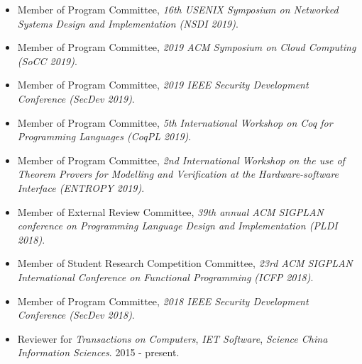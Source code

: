 \documentclass[10pt]{article}
\newenvironment{innerlist}[1][\enskip\textbullet]%
        {\begin{itemize}[#1,leftmargin=25pt,parsep=0pt,itemsep=2pt,topsep=2pt,partopsep=0pt]}
        {\end{itemize}}
\begin{document}
\begin{innerlist}

\item[] Member of Program Committee,
\emph{16th USENIX Symposium on Networked Systems Design and Implementation ({NSDI 2019})}.
\vspace{0.05in}

\item[] Member of Program Committee,
\emph{2019 ACM Symposium on Cloud Computing ({SoCC 2019})}.
\vspace{0.05in}

\item[] Member of Program Committee,
\emph{2019 IEEE Security Development Conference ({SecDev 2019})}.
\vspace{0.05in}

\item[] Member of Program Committee,
\emph{5th International Workshop on Coq for Programming Languages ({CoqPL 2019})}.
\vspace{0.05in}

\item[] Member of Program Committee,
\emph{2nd International Workshop on the use of Theorem Provers for Modelling and
Verification at the Hardware-software Interface ({ENTROPY 2019})}.
\vspace{0.05in}

\item[] Member of External Review Committee,
\emph{39th annual ACM SIGPLAN conference on Programming Language Design and Implementation ({PLDI 2018})}.
\vspace{0.05in}

\item[]  Member of Student Research Competition Committee, 
\emph{23rd ACM SIGPLAN International Conference on Functional Programming ({ICFP 2018})}.
\vspace{0.05in}


\item[] Member of Program Committee,
\emph{2018 IEEE Security Development Conference ({SecDev 2018})}.
\vspace{0.05in}

\item[] Reviewer for
\emph{Transactions on Computers},
\emph{IET Software},
\emph{Science China Information Sciences}. 2015 - present.

\end{innerlist}
\end{document}
